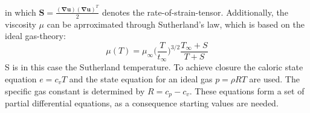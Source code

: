 \documentclass[11pt,a4paper,openany,oneside,parskip=half*]{article}
\renewcommand*\vec[1]{\boldsymbol{#1}}
\renewcommand*\matrix[1]{\boldsymbol{#1}}
\begin{document}
in which $ \matrix{S} = \frac{(\vec\nabla \vec{u})(\vec\nabla \vec{u})^T}{2} $ denotes the rate-of-strain-tensor. Additionally, the viscosity
$ \mu $ can be aprroximated through Sutherland's law, which is based on the ideal gas-theory: 
\begin{equation}
 \mu (T) = \mu_\infty \biggl(\frac{T}{t_\infty}\biggl)^{3/2} \frac{T_\infty + S}{T + S}
\end{equation}
S is in this case the Sutherland temperature.
To achieve closure the caloric state equation $ e = c_v T $ and the state equation for an ideal gas $
p = \rho R T $ are used. The specific gas constant is determined by $ R = c_p - c_v $. 
These equations form a set of partial differential equations, as a consequence starting values are needed.
\pagebreak
\end{document}

